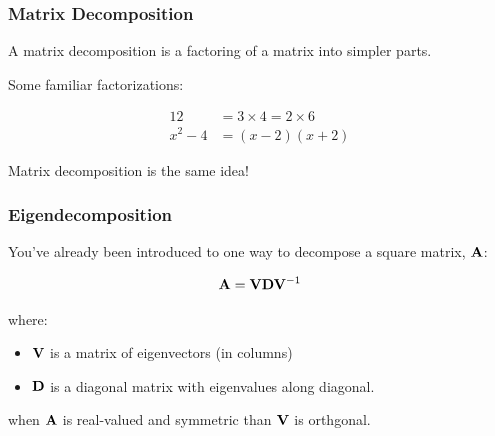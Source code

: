 \documentclass{beamer}
\begin{document}
\begin{frame}[fragile]
  \frametitle{Matrix Decomposition}

A matrix decomposition is a factoring of a matrix into simpler parts.

\medskip
Some familiar factorizations:

\begin{align*}
12 &= 3 \times 4 = 2 \times 6  \\
x^2 - 4 &= (x-2)(x+2)
\end{align*}


\begin{center}
   \alert{Matrix decomposition is the same idea!}
\end{center}



\end{frame}



\begin{frame}
  \frametitle{Eigendecomposition}


You've already been introduced to one way to decompose a square matrix, $\mathbf{A}$:

$$ \mathbf{A} = \mathbf{V}\mathbf{D}\mathbf{V}^{-1} $$

where:
\begin{itemize}
\item  $\mathbf{V}$ is a matrix of eigenvectors (in columns)
\item $\mathbf{D}$ is a diagonal matrix with eigenvalues along diagonal.
\end{itemize}

\medskip
when $\mathbf{A}$ is real-valued and symmetric than $\mathbf{V}$ is orthgonal.

\end{frame}





\end{document}
